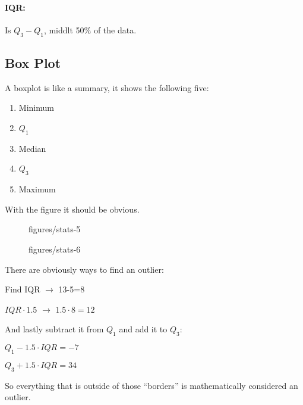 \documentclass{book}
\begin{document}
\paragraph{IQR:} Is $Q_3 -Q_1$, middlt 50\% of the data.

\subsection{Box Plot}

A boxplot is like a summary, it shows the following five:
\begin{enumerate}
    \item Minimum
    \item $Q_1$
    \item Median
    \item $Q_3$
    \item Maximum
\end{enumerate}
With the figure it should be obvious.

\begin{figure}[ht]
    \centering
    \caption{figures/stats-5}
    \label{fig:stats-5}
\end{figure}

\begin{figure}[ht]
    \centering
    \caption{figures/stats-6}
    \label{fig:stats-6}
\end{figure}

\vspace{50pt}

There are obviously ways to find an outlier:

Find IQR $\to$ 13-5=8

$IQR \cdot 1.5$ $\to $ $1.5\cdot 8=12$

And lastly subtract it from $Q_1$ and add it to $Q_3$:

$Q_1 - 1.5\cdot IQR = -7$

$Q_3 + 1.5\cdot IQR = 34$

So everything that is outside of those ``borders'' is mathematically considered an outlier.
\end{document}
